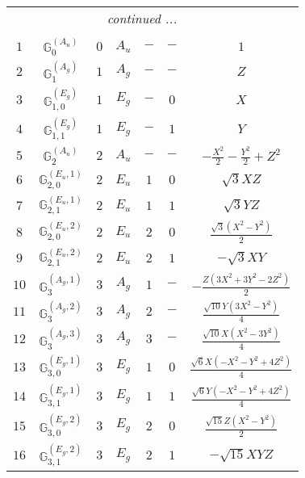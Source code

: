 \documentclass[fleqn,10pt,landscape]{article}
\begin{document}
\begin{itemize}
\begin{center}
\begin{longtable}{ccccccc}
 \hline \hline
\multicolumn{6}{r}{\footnotesize\it continued ...} \\ \endfoot

 \hline \hline
\multicolumn{6}{r}{} \\ \endlastfoot

$ 1 $ & $ \mathbb{G}_{0}^{(A_{u})} $ & $ 0 $ & $ A_{u} $ & $ - $ & $ - $ & $ 1 $ \\ \hline
$ 2 $ & $ \mathbb{G}_{1}^{(A_{g})} $ & $ 1 $ & $ A_{g} $ & $ - $ & $ - $ & $ Z $ \\
$ 3 $ & $ \mathbb{G}_{1,0}^{(E_{g})} $ & $ 1 $ & $ E_{g} $ & $ - $ & $ 0 $ & $ X $ \\
$ 4 $ & $ \mathbb{G}_{1,1}^{(E_{g})} $ & $ 1 $ & $ E_{g} $ & $ - $ & $ 1 $ & $ Y $ \\ \hline
$ 5 $ & $ \mathbb{G}_{2}^{(A_{u})} $ & $ 2 $ & $ A_{u} $ & $ - $ & $ - $ & $ - \frac{X^{2}}{2} - \frac{Y^{2}}{2} + Z^{2} $ \\
$ 6 $ & $ \mathbb{G}_{2,0}^{(E_{u},1)} $ & $ 2 $ & $ E_{u} $ & $ 1 $ & $ 0 $ & $ \sqrt{3} X Z $ \\
$ 7 $ & $ \mathbb{G}_{2,1}^{(E_{u},1)} $ & $ 2 $ & $ E_{u} $ & $ 1 $ & $ 1 $ & $ \sqrt{3} Y Z $ \\
$ 8 $ & $ \mathbb{G}_{2,0}^{(E_{u},2)} $ & $ 2 $ & $ E_{u} $ & $ 2 $ & $ 0 $ & $ \frac{\sqrt{3} \left(X^{2} - Y^{2}\right)}{2} $ \\
$ 9 $ & $ \mathbb{G}_{2,1}^{(E_{u},2)} $ & $ 2 $ & $ E_{u} $ & $ 2 $ & $ 1 $ & $ - \sqrt{3} X Y $ \\ \hline
$ 10 $ & $ \mathbb{G}_{3}^{(A_{g},1)} $ & $ 3 $ & $ A_{g} $ & $ 1 $ & $ - $ & $ - \frac{Z \left(3 X^{2} + 3 Y^{2} - 2 Z^{2}\right)}{2} $ \\
$ 11 $ & $ \mathbb{G}_{3}^{(A_{g},2)} $ & $ 3 $ & $ A_{g} $ & $ 2 $ & $ - $ & $ \frac{\sqrt{10} Y \left(3 X^{2} - Y^{2}\right)}{4} $ \\
$ 12 $ & $ \mathbb{G}_{3}^{(A_{g},3)} $ & $ 3 $ & $ A_{g} $ & $ 3 $ & $ - $ & $ \frac{\sqrt{10} X \left(X^{2} - 3 Y^{2}\right)}{4} $ \\
$ 13 $ & $ \mathbb{G}_{3,0}^{(E_{g},1)} $ & $ 3 $ & $ E_{g} $ & $ 1 $ & $ 0 $ & $ \frac{\sqrt{6} X \left(- X^{2} - Y^{2} + 4 Z^{2}\right)}{4} $ \\
$ 14 $ & $ \mathbb{G}_{3,1}^{(E_{g},1)} $ & $ 3 $ & $ E_{g} $ & $ 1 $ & $ 1 $ & $ \frac{\sqrt{6} Y \left(- X^{2} - Y^{2} + 4 Z^{2}\right)}{4} $ \\
$ 15 $ & $ \mathbb{G}_{3,0}^{(E_{g},2)} $ & $ 3 $ & $ E_{g} $ & $ 2 $ & $ 0 $ & $ \frac{\sqrt{15} Z \left(X^{2} - Y^{2}\right)}{2} $ \\
$ 16 $ & $ \mathbb{G}_{3,1}^{(E_{g},2)} $ & $ 3 $ & $ E_{g} $ & $ 2 $ & $ 1 $ & $ - \sqrt{15} X Y Z $ \\
\end{longtable}
\end{center}


\end{itemize}
\end{document}
